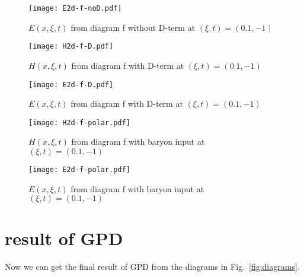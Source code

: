 \documentclass[preprintnumbers,prd,superscriptaddress,preprint]{revtex4-1}
\begin{document}
	\begin{figure}[h]
		\begin{center}
			\texttt{[image: E2d-f-noD.pdf]}
			\caption{$E(x,\xi,t)$ from diagram f without D-term at $(\xi,t)=(0.1,-1)$} 
			\label{E-f-nD}
		\end{center}
	\end{figure}
	\begin{figure}[h]
		\begin{center}
			\texttt{[image: H2d-f-D.pdf]}
			\caption{$H(x,\xi,t)$ from diagram f with D-term at $(\xi,t)=(0.1,-1)$} 
			\label{H-f-D}
		\end{center}
	\end{figure}
	\begin{figure}[h]
		\begin{center}
			\texttt{[image: E2d-f-D.pdf]}
			\caption{$E(x,\xi,t)$ from diagram f with D-term at $(\xi,t)=(0.1,-1)$} 
			\label{E-f-D}
		\end{center}
	\end{figure}
	\begin{figure}[h]
		\begin{center}
			\texttt{[image: H2d-f-polar.pdf]}
			\caption{$H(x,\xi,t)$ from diagram f with baryon input at $(\xi,t)=(0.1,-1)$} 
			\label{H-f-polar}
		\end{center}
	\end{figure}
	\begin{figure}[h]
		\begin{center}
			\texttt{[image: E2d-f-polar.pdf]}
			\caption{$E(x,\xi,t)$ from diagram f  with baryon input at $(\xi,t)=(0.1,-1)$} 
			\label{E-f-polar}
		\end{center}
	\end{figure}
	\section{result of GPD}
	Now we can get the final result of GPD from the diagrams in Fig.~\ref{fig:diagrams}. 
\end{document}
